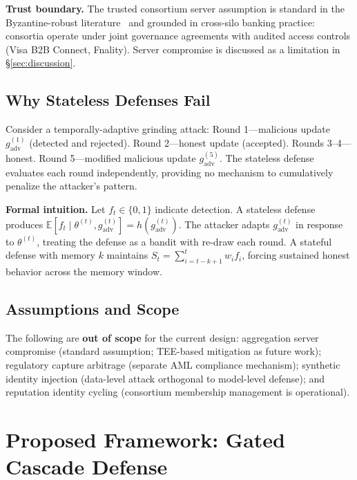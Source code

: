 \documentclass[10pt,journal]{IEEEtran}
\begin{document}
\textbf{Trust boundary.} The trusted consortium server assumption is standard in the Byzantine-robust literature~\cite{blanchard2017,yin2018,guerraoui2018,cao2021,fung2020,zhang2022} and grounded in cross-silo banking practice: consortia operate under joint governance agreements with audited access controls (Visa B2B Connect, Fnality). Server compromise is discussed as a limitation in \S\ref{sec:discussion}.

\subsection{Why Stateless Defenses Fail}

Consider a temporally-adaptive grinding attack: Round 1---malicious update $g_{\text{adv}}^{(1)}$ (detected and rejected). Round 2---honest update (accepted). Rounds 3--4---honest. Round 5---modified malicious update $g_{\text{adv}}^{(5)}$. The stateless defense evaluates each round independently, providing no mechanism to cumulatively penalize the attacker's pattern.

\textbf{Formal intuition.} Let $f_t \in \{0,1\}$ indicate detection. A stateless defense produces $\mathbb{E}[f_t \mid \theta^{(t)}, g_{\text{adv}}^{(t)}] = h(g_{\text{adv}}^{(t)})$. The attacker adapts $g_{\text{adv}}^{(t)}$ in response to $\theta^{(t)}$, treating the defense as a bandit with re-draw each round. A stateful defense with memory $k$ maintains $S_t = \sum_{i=t-k+1}^{t} w_i f_i$, forcing sustained honest behavior across the memory window.

\subsection{Assumptions and Scope}

The following are \textbf{out of scope} for the current design: aggregation server compromise (standard assumption; TEE-based mitigation as future work); regulatory capture arbitrage (separate AML compliance mechanism); synthetic identity injection (data-level attack orthogonal to model-level defense); and reputation identity cycling (consortium membership management is operational).

\section{Proposed Framework: Gated Cascade Defense}
\label{sec:framework}
\end{document}

